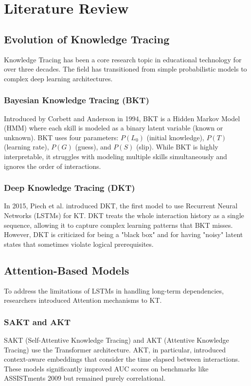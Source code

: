 \chapter{Literature Review}

\section{Evolution of Knowledge Tracing}
Knowledge Tracing has been a core research topic in educational technology for over three decades. The field has transitioned from simple probabilistic models to complex deep learning architectures.

\subsection{Bayesian Knowledge Tracing (BKT)}
Introduced by Corbett and Anderson in 1994, BKT is a Hidden Markov Model (HMM) where each skill is modeled as a binary latent variable (known or unknown). BKT uses four parameters: $P(L_0)$ (initial knowledge), $P(T)$ (learning rate), $P(G)$ (guess), and $P(S)$ (slip). While BKT is highly interpretable, it struggles with modeling multiple skills simultaneously and ignores the order of interactions.

\subsection{Deep Knowledge Tracing (DKT)}
In 2015, Piech et al. introduced DKT, the first model to use Recurrent Neural Networks (LSTMs) for KT. DKT treats the whole interaction history as a single sequence, allowing it to capture complex learning patterns that BKT misses. However, DKT is criticized for being a "black box" and for having "noisy" latent states that sometimes violate logical prerequisites.

\section{Attention-Based Models}
To address the limitations of LSTMs in handling long-term dependencies, researchers introduced Attention mechanisms to KT.

\subsection{SAKT and AKT}
SAKT (Self-Attentive Knowledge Tracing) and AKT (Attentive Knowledge Tracing) use the Transformer architecture. AKT, in particular, introduced context-aware embeddings that consider the time elapsed between interactions. These models significantly improved AUC scores on benchmarks like ASSISTments 2009 but remained purely correlational.

